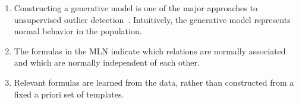 	\begin{enumerate}
		\item Constructing a generative model is one of the major approaches to unsupervised outlier detection~\cite{aggarwal2013}. Intuitively, the generative model represents normal behavior in the population. 
		\item The formulas in the MLN indicate which relations are normally associated and which are normally independent of each other. 
		\item Relevant formulas are learned from the data, rather than constructed from a fixed a priori set of templates.
	\end{enumerate}
	
	
	
